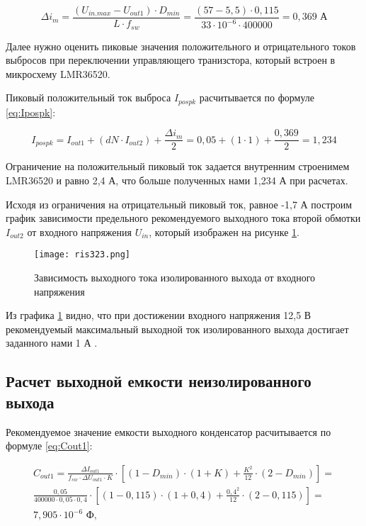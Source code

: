 \begin{equation}
    \varDelta i_{m} =
    \frac{(U_{in.max} - U_{out1}) \cdot D_{min}}{L \cdot f_{sw}} =
    \frac{(57 - 5,5) \cdot 0,115}{33 \cdot 10^{-6} \cdot 400000} =
    0,369 \text{ А}
    \label{eq:dIm}
\end{equation}

Далее нужно оценить пиковые значения положительного и отрицательного токов выбросов при переключении
управляющего транизстора, который встроен в микросхему LMR36520. 

Пиковый положительный ток выброса $I_{pospk}$ расчитывается по формуле \ref{eq:Ipospk}:

\begin{equation}
    I_{pospk} =
    I_{out1} + (dN \cdot I_{out2}) + \frac{\Delta i_{m}}{2} = 
    0,05 + (1 \cdot 1) + \frac{0,369}{2} =
    1,234
    \label{eq:Ipospk}
\end{equation}

Ограничение на положительный пиковый ток задается внутренним строенимем LMR36520 и равно 2,4 А, что больше
полученных нами 1,234 А при расчетах. 

Исходя из ограничения на отрицательный пиковый ток, равное -1,7 А построим график зависимости предельного 
рекомендуемого выходного тока второй обмотки $I_{out2}$ от входного напряжения $U_{in}$, который изображен 
на рисунке \ref{ris:323}.

\begin{figure}[H]
    \centering
    \texttt{[image: ris323.png]}
    \caption{Зависимость выходного тока изолированного выхода от входного напряжения}
    \label{ris:323}
\end{figure}

Из графика \ref{ris:323} видно, что при достижении входного напряжения 12,5 В рекомендуемый максимальный 
выходной ток изолированного выхода достигает заданного нами 1 А \cite{LMR36520:Aplication Note}. 

\subsection{Расчет выходной емкости неизолированного выхода}
\hspace{1cm} 

Рекомендуемое значение емкости выходного конденсатор расчитывается по формуле \ref{eq:Cout1}:

\begin{eqnarray}
    C_{out1} =
    \frac{\Delta I_{out1}}{f_{sw} \cdot \Delta U_{out1} \cdot K} \cdot 
    [(1 - D_{min}) \cdot (1 + K) + \frac{K^{2}}{12} \cdot (2 - D_{min})] = \nonumber\\
    \frac{0,05}{400000 \cdot 0,05 \cdot 0,4} \cdot 
    [(1 - 0,115) \cdot (1 + 0,4) + \frac{0,4^{2}}{12} \cdot (2 - 0,115)]  =\nonumber \\
    7,905 \cdot 10^{-6} \text{ Ф, }
    \label{eq:Cout1}
\end{eqnarray}

